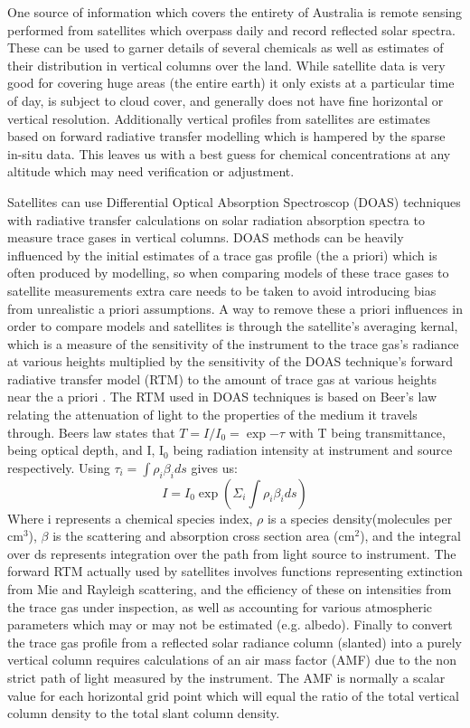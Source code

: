 One source of information which covers the entirety of Australia is remote sensing performed from satellites which overpass daily and record reflected solar spectra.
These can be used to garner details of several chemicals as well as estimates of their distribution in vertical columns over the land.
While satellite data is very good for covering huge areas (the entire earth) it only exists at a particular time of day, is subject to cloud cover, and generally does not have fine horizontal or vertical resolution.
Additionally vertical profiles from satellites are estimates based on forward radiative transfer modelling which is hampered by the sparse in-situ data.
This leaves us with a best guess for chemical concentrations at any altitude which may need verification or adjustment.

Satellites can use Differential Optical Absorption Spectroscop (DOAS) techniques with radiative transfer calculations on solar radiation absorption spectra to measure trace gases in vertical columns.
DOAS methods can be heavily influenced by the initial estimates of a trace gas profile (the a priori) which is often produced by modelling, so when comparing models of these trace gases to satellite measurements extra care needs to be taken to avoid introducing bias from unrealistic a priori assumptions.
A way to remove these a priori influences in order to compare models and satellites is through the satellite's averaging kernal, which is a measure of the sensitivity of the instrument to the trace gas's radiance at various heights multiplied by the sensitivity of the DOAS technique's forward radiative transfer model (RTM) to the amount of trace gas at various heights near the a priori \cite{Eskes_2003}.
The RTM used in DOAS techniques is based on Beer's law relating the attenuation of light to the properties of the medium it travels through.
Beers law states that $ T = I/I_0 = \exp{-\tau} $ with T being transmittance, \tau being optical depth, and I, I$_0$ being radiation intensity at instrument and source respectively.
Using $ \tau_i = \int \rho_i \beta_i ds $ gives us:
$$ I = I_0 \exp \left( \Sigma_i \int \rho_i \beta_i ds \right) $$
Where i represents a chemical species index, $\rho$ is a species density(molecules per cm$^3$), $\beta$ is the scattering and absorption cross section area (cm$^2$), and the integral over ds represents integration over the path from light source to instrument.
The forward RTM actually used by satellites involves functions representing extinction from Mie and Rayleigh scattering, and the efficiency of these on intensities from the trace gas under inspection, as well as accounting for various atmospheric parameters which may or may not be estimated (e.g. albedo).
Finally to convert the trace gas profile from a reflected solar radiance column (slanted) into a purely vertical column requires calculations of an air mass factor (AMF) due to the non strict path of light measured by the instrument.
The AMF is normally a scalar value for each horizontal grid point which will equal the ratio of the total vertical column density to the total slant column density.

